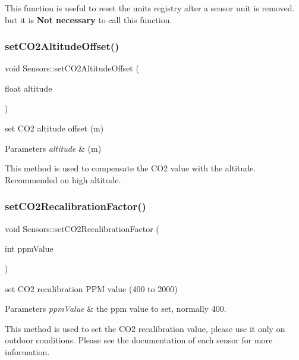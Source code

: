 This function is useful to reset the units registry after a sensor unit is removed. but it is {\bfseries Not necessary} to call this function. \mbox{\label{classSensors_a27eec756609a421b3927c0dc132ae7c6}} 
\subsubsection{\texorpdfstring{set\+C\+O2\+Altitude\+Offset()}{setCO2AltitudeOffset()}}
{\footnotesize\ttfamily void Sensors\+::set\+C\+O2\+Altitude\+Offset (\begin{DoxyParamCaption}\item[{float}]{altitude }\end{DoxyParamCaption})}



set C\+O2 altitude offset (m) 


\begin{DoxyParams}{Parameters}
{\em altitude} & (m)\\
\hline
\end{DoxyParams}
This method is used to compensate the C\+O2 value with the altitude. Recommended on high altitude. \mbox{\label{classSensors_a47f337a24231440b661d57ed8e873a64}} 
\subsubsection{\texorpdfstring{set\+C\+O2\+Recalibration\+Factor()}{setCO2RecalibrationFactor()}}
{\footnotesize\ttfamily void Sensors\+::set\+C\+O2\+Recalibration\+Factor (\begin{DoxyParamCaption}\item[{int}]{ppm\+Value }\end{DoxyParamCaption})}



set C\+O2 recalibration P\+PM value (400 to 2000) 


\begin{DoxyParams}{Parameters}
{\em ppm\+Value} & the ppm value to set, normally 400.\\
\hline
\end{DoxyParams}
This method is used to set the C\+O2 recalibration value, please use it only on outdoor conditions. Please see the documentation of each sensor for more information. \mbox{\label{classSensors_ac749e2c2618a177afa7d72ce68573fa5}} 
